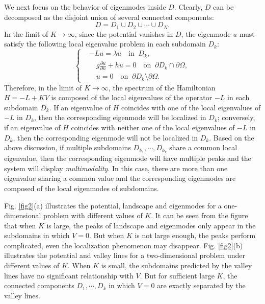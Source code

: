 \documentclass[a4paper,11pt]{article}
\begin{document}
We next focus on the behavior of eigenmodes inside $D$. Clearly, $D$ can be decomposed as the disjoint union of several connected components:
\begin{equation*}
D = D_1 \cup D_2 \cup \cdots \cup D_N.
\end{equation*}
In the limit of $K\rightarrow\infty$, since the potential vanishes in $D$, the eigenmode $u$ must satisfy the following local eigenvalue problem in each subdomain $D_k$:
\begin{equation}\label{subdomain}
\left\{
\begin{split}
& - L u = \lambda u \quad \textrm{in}\;\;D_k, \\
& \quad g \frac{\partial u}{\partial n} + h u = 0 \quad \textrm{on}\;\;\partial D_k \cap \partial \Omega, \\
& \quad u = 0 \quad \textrm{on}\;\;\partial D_k \setminus \partial \Omega.
\end{split}
\right.
\end{equation}
Therefore, in the limit of $K \rightarrow \infty$, the spectrum of the Hamiltonian $H = - L + K V$ is composed of the local eigenvalues of the operator $-L$ in each subdomain $D_k$. If an eigenvalue of $H$ coincides with one of the local eigenvalues of $-L$ in $D_k$, then the corresponding eigenmode will be localized in $D_k$; conversely, if an eigenvalue of $H$ coincides with neither one of the local eigenvalues of $-L$ in $D_k$, then the corresponding eigenmode will not be localized in $D_k$. Based on the above discussion, if multiple subdomains $D_{k_1}, \cdots , D_{k_r}$ share a common local eigenvalue, then the corresponding eigenmode will have multiple peaks and the system will display \emph{multimodality}. In this case, there are more than one eigenvalue sharing a common value and the corresponding eigenmodes are composed of the local eigenmodes of subdomains.

Fig. \ref{fig2}(a) illustrates the potential, landscape and eigenmodes for a one-dimensional problem with different values of $K$. It can be seen from the figure that when $K$ is large, the peaks of landscape and eigenmodes only appear in the subdomains in which $V = 0$. But when $K$ is not large enough, the peaks perform complicated, even the localization phenomenon may disappear. Fig. \ref{fig2}(b) illustrates the potential and valley lines for a two-dimensional problem under different values of $K$. When $K$ is small, the subdomains predicted by the valley lines have no significant relationship with $V$. But for sufficient large $K$, the connected components $D_1, \cdots, D_k$ in which $V = 0$ are exactly separated by the valley lines. 
\end{document}
